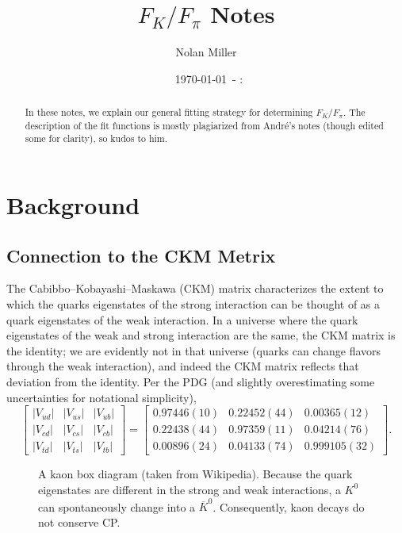 \documentclass[prd,tightenlines,preprintnumbers,showpacs,superscriptaddress,notitlepage,eqsecnum,floatfix,notitlepage]{revtex4-1}
\newcommand{\mydate}{\ \today \ - \number\hour :\number\minute}
\newcommand{\includegraphicsifexists}[2][]{\IfFileExists{#2}{\texttt{[image: \#2]}}{\texttt{[image: \#2]}}}
\begin{document}
\title{$F_K / F_\pi$ Notes}
\author{Nolan Miller}
\date{\mydate}


\begin{abstract}
In these notes, we explain our general fitting strategy for determining $F_K / F_\pi$. The description of the fit functions is mostly plagiarized from André's notes (though edited some for clarity), so kudos to him.
\end{abstract}
\maketitle

\section{Background}
\subsection{Connection to the CKM Metrix}
The Cabibbo–Kobayashi–Maskawa (CKM) matrix characterizes the extent to which the quarks eigenstates of the strong interaction can be thought of as a quark eigenstates of the weak interaction. In a universe where the quark eigenstates of the weak and strong interaction are the same, the CKM matrix is the identity; we are evidently not in that universe (quarks can change flavors through the weak interaction), and indeed the CKM matrix reflects that deviation from the identity. Per the PDG \cite{PhysRevD.98.030001} (and slightly overestimating some uncertainties for notational simplicity),
\begin{equation}
\begin{bmatrix}
|V_{ud}| & |V_{us}| & |V_{ub}| \\
|V_{cd}| & |V_{cs}| & |V_{cb}| \\
|V_{td}| & |V_{ts}| & |V_{tb}|
\end{bmatrix} = \begin{bmatrix}
0.97446(10) & 0.22452(44) & 0.00365(12) \\
0.22438(44) & 0.97359(11) & 0.04214(76) \\
0.00896(24) & 0.04133(74) & 0.999105(32)
\end{bmatrix}.
\end{equation}

\begin{figure}
	\includegraphicsifexists[width=0.4\textwidth]{./../figs/kaon_box_diagram.png}
	\caption{A kaon box diagram  (taken from Wikipedia). Because the quark eigenstates are different in the strong and weak interactions, a $K^0$ can spontaneously change into a $\overline{K}^0$. Consequently, kaon decays do not conserve CP.}
\end{figure}
\end{document}

